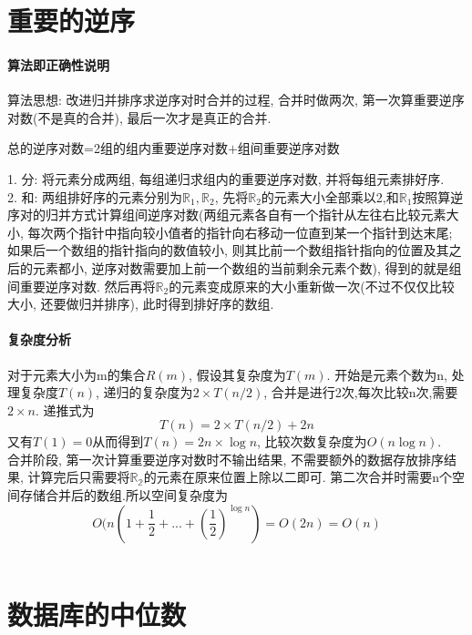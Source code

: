 \documentclass[a4paper,10pt]{article}
\begin{document}
  
\section{重要的逆序}
  \paragraph{算法即正确性说明} 算法思想: 改进归并排序求逆序对时合并的过程, 合并时做两次, 第一次算重要逆序对数(不是真的合并), 最后一次才是真正的合并.
  \begin{center}
   总的逆序对数=2组的组内重要逆序对数$+$组间重要逆序对数
  \end{center}
  1. 分: 将元素分成两组, 每组递归求组内的重要逆序对数, 并将每组元素排好序.\\
  2. 和: 两组排好序的元素分别为$\mathbb{R}_1, \mathbb{R}_2$, 先将$\mathbb{R}_2$的元素大小全部乘以2,和$\mathbb{R}_1$按照算逆序对的归并方式计算组间逆序对数(两组元素各自有一个指针从左往右比较元素大小, 每次两个指针中指向较小值者的指针向右移动一位直到某一个指针到达末尾; 如果后一个数组的指针指向的数值较小, 则其比前一个数组指针指向的位置及其之后的元素都小, 逆序对数需要加上前一个数组的当前剩余元素个数), 得到的就是组间重要逆序对数. 然后再将$\mathbb{R}_2$的元素变成原来的大小重新做一次(不过不仅仅比较大小, 还要做归并排序), 此时得到排好序的数组.
  \paragraph{复杂度分析}
  对于元素大小为m的集合$R(m)$, 假设其复杂度为$T(m)$. 开始是元素个数为n, 处理复杂度$T(n)$, 递归的复杂度为$2\times T(n/2)$, 合并是进行2次,每次比较n次,需要$2\times n$. 递推式为 
  $$T(n)=2\times T(n/2) + 2n$$
  又有$T(1) = 0$从而得到$T(n)=2n\times\log n$, 比较次数复杂度为$O(n\log n)$. \\
  合并阶段, 第一次计算重要逆序对数时不输出结果, 不需要额外的数据存放排序结果, 计算完后只需要将$\mathbb{R_2}$的元素在原来位置上除以二即可. 第二次合并时需要n个空间存储合并后的数组.所以空间复杂度为
  $$O(n(1+\frac{1}{2} +...+(\frac{1}{2})^{\log n})=O(2n)=O(n)$$\\
  
\section{数据库的中位数}
\end{document}
